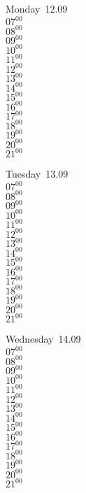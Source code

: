 \documentclass[11pt,a4paper]{book}\usepackage[]{graphicx}\usepackage[]{color}
\begin{document}
\begin{headerbox}
\end{headerbox}
\begin{weekdaybox}
  Monday~12.09\\
  { 
  \vfill
  $07^{00}$\\
$08^{00}$\\
$09^{00}$\\
$10^{00}$\\
$11^{00}$\\
$12^{00}$\\
$13^{00}$\\
$14^{00}$\\
$15^{00}$\\
$16^{00}$\\
$17^{00}$\\
$18^{00}$\\
$19^{00}$\\
$20^{00}$\\
$21^{00}$\\
  }
\end{weekdaybox}
\begin{weekdaybox}
  Tuesday~13.09\\
  { 
  \vfill
  $07^{00}$\\
$08^{00}$\\
$09^{00}$\\
$10^{00}$\\
$11^{00}$\\
$12^{00}$\\
$13^{00}$\\
$14^{00}$\\
$15^{00}$\\
$16^{00}$\\
$17^{00}$\\
$18^{00}$\\
$19^{00}$\\
$20^{00}$\\
$21^{00}$\\
  }
\end{weekdaybox}
\begin{weekdaybox}
  Wednesday~14.09\\
  { 
  \vfill
  $07^{00}$\\
$08^{00}$\\
$09^{00}$\\
$10^{00}$\\
$11^{00}$\\
$12^{00}$\\
$13^{00}$\\
$14^{00}$\\
$15^{00}$\\
$16^{00}$\\
$17^{00}$\\
$18^{00}$\\
$19^{00}$\\
$20^{00}$\\
$21^{00}$\\
  }
\end{weekdaybox}
\end{document}
